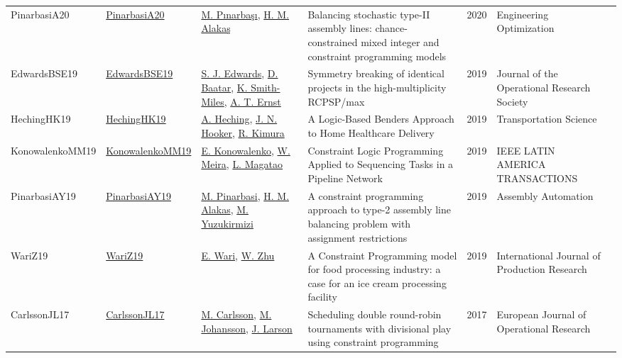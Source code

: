 {\begin{longtable}{p{2cm}p{2cm}p{5cm}p{10cm}rp{3cm}l}
PinarbasiA20 & \href{http://dx.doi.org/10.1080/0305215x.2020.1716746}{PinarbasiA20} & \hyperref[auth:a1385]{M. Pınarbaşı}, \hyperref[auth:a764]{H. M. Alakaş} & Balancing stochastic type-II assembly lines: chance-constrained mixed integer and constraint programming models & 2020 & \cellcolor{red!20}Engineering Optimization & \cite{PinarbasiA20}\\
EdwardsBSE19 & \href{http://dx.doi.org/10.1080/01605682.2019.1595192}{EdwardsBSE19} & \hyperref[auth:a892]{S. J. Edwards}, \hyperref[auth:a893]{D. Baatar}, \hyperref[auth:a894]{K. Smith-Miles}, \hyperref[auth:a469]{A. T. Ernst} & Symmetry breaking of identical projects in the high-multiplicity RCPSP/max & 2019 & \cellcolor{red!20}Journal of the Operational Research Society & \cite{EdwardsBSE19}\\
HechingHK19 & \href{http://dx.doi.org/10.1287/trsc.2018.0830}{HechingHK19} & \hyperref[auth:a1022]{A. Heching}, \hyperref[auth:a160]{J. N. Hooker}, \hyperref[auth:a1023]{R. Kimura} & \cellcolor{gold!20}A Logic-Based Benders Approach to Home Healthcare Delivery & 2019 & \cellcolor{red!20}Transportation Science & \cite{HechingHK19}\\
KonowalenkoMM19 & \href{http://dx.doi.org/10.1109/tla.2019.8932340}{KonowalenkoMM19} & \hyperref[auth:a1467]{E. Konowalenko}, \hyperref[auth:a1468]{W. Meira}, \hyperref[auth:a1469]{L. Magatao} & Constraint Logic Programming Applied to Sequencing Tasks in a Pipeline Network & 2019 & IEEE LATIN AMERICA TRANSACTIONS & \cite{KonowalenkoMM19}\\
PinarbasiAY19 & \href{http://dx.doi.org/10.1108/aa-12-2018-0262}{PinarbasiAY19} & \hyperref[auth:a413]{M. Pinarbasi}, \hyperref[auth:a1424]{H. M. Alakas}, \hyperref[auth:a1425]{M. Yuzukirmizi} & A constraint programming approach to type-2 assembly line balancing problem with assignment restrictions & 2019 & Assembly Automation & \cite{PinarbasiAY19}\\
WariZ19 & \href{http://dx.doi.org/10.1080/00207543.2019.1571250}{WariZ19} & \hyperref[auth:a839]{E. Wari}, \hyperref[auth:a840]{W. Zhu} & A Constraint Programming model for food processing industry: a case for an ice cream processing facility & 2019 & \cellcolor{red!20}International Journal of Production Research & \cite{WariZ19}\\
CarlssonJL17 & \href{https://doi.org/10.1016/j.ejor.2016.11.033}{CarlssonJL17} & \hyperref[auth:a91]{M. Carlsson}, \hyperref[auth:a75]{M. Johansson}, \hyperref[auth:a1413]{J. Larson} & \cellcolor{gold!20}Scheduling double round-robin tournaments with divisional play using constraint programming & 2017 & European Journal of Operational Research & \cite{CarlssonJL17}\\

\end{longtable}}
